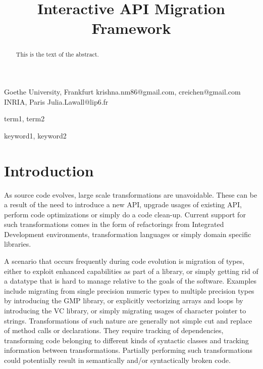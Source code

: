 \documentclass[preprint]{sigplanconf}
\begin{document}
\setlength{\pdfpageheight}{\paperheight}
\setlength{\pdfpagewidth}{\paperwidth}



\titlebanner{}        %
\preprintfooter{}   %

\title{Interactive API Migration Framework}
\subtitle{}

           {Goethe University, Frankfurt}
           {krishna.nm86@gmail.com, creichen@gmail.com}
           {INRIA, Paris}
           {Julia.Lawall@lip6.fr}

\maketitle

\begin{abstract}
This is the text of the abstract.
\end{abstract}


\terms
term1, term2

\keywords
keyword1, keyword2

\section{Introduction}
As source code evolves, large scale transformations are unavoidable. These can be a result of the need to introduce a new API, upgrade usages of existing API, perform code optimizations or simply do a code clean-up. Current support for such transformations comes in the form of refactorings from Integrated Development environments, transformation languages or simply domain specific libraries.

      A scenario that occurs frequently during code evolution is migration of types, either to exploit enhanced capabilities as part of a library, or simply getting rid of a datatype that is hard to manage relative to the goals of the software. Examples include migrating from single precision numeric types to multiple precision types by introducing the GMP library, or explicitly vectorizing arrays and loops by introducing the VC library, or simply migrating usages of character pointer to strings. Transformations of such nature are generally not simple cut and replace of method calls or declarations. They require tracking of dependencies, transforming code belonging to different kinds of syntactic classes and tracking information between transformations. Partially performing such transformations could potentially result in semantically and/or syntactically broken code. 
      
\end{document}
